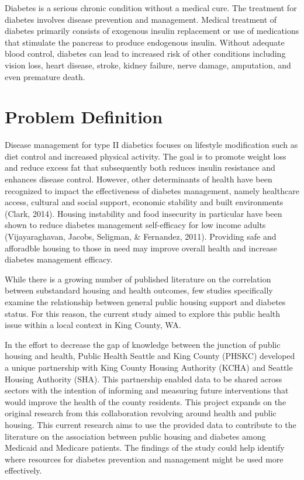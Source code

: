 \documentclass [11pt, proquest] {uwthesis}[2015/03/03]
\begin{document}
Diabetes is a serious chronic condition without a medical cure. The
treatment for diabetes involves disease prevention and management.
Medical treatment of diabetes primarily consists of exogenous insulin
replacement or use of medications that stimulate the pancreas to produce
endogenous insulin. Without adequate blood control, diabetes can lead to
increased risk of other conditions including vision loss, heart disease,
stroke, kidney failure, nerve damage, amputation, and even premature
death.

\section{Problem Definition}\label{problem-definition}

Disease management for type II diabetics focuses on lifestyle
modification such as diet control and increased physical activity. The
goal is to promote weight loss and reduce excess fat that subsequently
both reduces insulin resistance and enhances disease control. However,
other determinants of health have been recognized to impact the
effectiveness of diabetes management, namely healthcare access, cultural
and social support, economic stability and built environments (Clark,
2014). Housing instability and food insecurity in particular have been
shown to reduce diabetes management self-efficacy for low income adults
(Vijayaraghavan, Jacobs, Seligman, \& Fernandez, 2011). Providing safe
and afforadble housing to those in need may improve overall health and
increase diabetes management efficacy.

While there is a growing number of published literature on the
correlation between substandard housing and health outcomes, few studies
specifically examine the relationship between general public housing
support and diabetes status. For this reason, the current study aimed to
explore this public health issue within a local context in King County,
WA.

In the effort to decrease the gap of knowledge between the junction of
public housing and health, Public Health Seattle and King County (PHSKC)
developed a unique partnership with King County Housing Authority (KCHA)
and Seattle Housing Authority (SHA). This partnership enabled data to be
shared across sectors with the intention of informing and measuring
future interventions that would improve the health of the county
residents. This project expands on the original research from this
collaboration revolving around health and public housing. This current
research aims to use the provided data to contribute to the literature
on the association between public housing and diabetes among Medicaid
and Medicare patients. The findings of the study could help identify
where resources for diabetes prevention and management might be used
more effectively.
\end{document}
